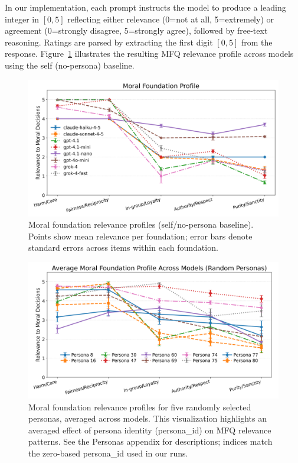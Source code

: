 \documentclass{article}
\begin{document}
In our implementation, each prompt instructs the model to produce a leading integer in \([0,5]\) reflecting either relevance (0=not at all, 5=extremely) or agreement (0=strongly disagree, 5=strongly agree), followed by free-text reasoning. Ratings are parsed by extracting the first digit \([0,5]\) from the response. Figure~\ref{fig:mfq-profiles} illustrates the resulting MFQ relevance profile across models using the self (no-persona) baseline.

\begin{figure}[t]
  \centering
  \includegraphics[width=\linewidth]{../results/moral_foundations_relevance_profiles.png}
  \caption{Moral foundation relevance profiles (self/no-persona baseline). Points show mean relevance per foundation; error bars denote standard errors across items within each foundation.}
  \label{fig:mfq-profiles}
\end{figure}

\begin{figure}[t]
  \centering
  \includegraphics[width=\linewidth]{../results/persona_moral_foundations_relevance_profiles.png}
  \caption{Moral foundation relevance profiles for five randomly selected personas, averaged across models. This visualization highlights an averaged effect of persona identity (persona\_id) on MFQ relevance patterns. See the Personas appendix for descriptions; indices match the zero-based persona\_id used in our runs.}
  \label{fig:persona-mfq-profiles}
\end{figure}
\end{document}
